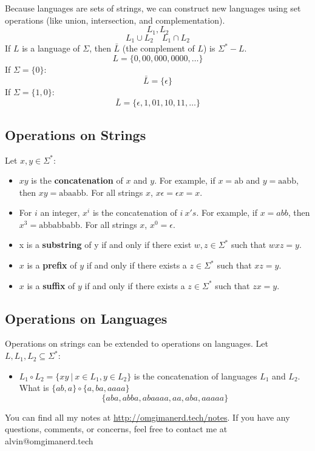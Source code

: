 \documentclass[letterpaper, 12pt]{math}
\begin{document}
Because languages are sets of strings, we can construct new languages using
set operations (like union, intersection, and complementation).
\[ L_{1}, L_{2} \]
\[ L_{1}\cup L_{2} \quad L_{1}\cap L_{2} \]
If \( L \) is a language of \( \Sigma \), then \( \bar{L} \) (the complement of
\( L \)) is \( \Sigma^*-L \).
\[ L = \{0,00,000,0000,\dots\} \]
If \( \Sigma = \{0\} \):
\[ \bar{L} = \{\epsilon\} \]
If \( \Sigma = \{1,0\} \):
\[ \bar{L} = \{\epsilon,1,01,10,11,\dots\} \]

\subsection*{Operations on Strings}
Let \( x,y\in\Sigma^* \):
\begin{itemize}
  \item \( xy \) is the \textbf{concatenation} of \( x \) and \( y \). For
    example, if \( x = \text{ab} \) and \( y = \text{aabb} \), then \( xy =
    \text{abaabb} \). For all strings \( x \), \( x\epsilon = \epsilon x =
    x \).
  \item For \( i \) an integer, \( x^i \) is the concatenation of \( i\ x's \).
    For example, if \( x = abb \), then \( x^{3} = \text{abbabbabb} \). For all
    strings \( x \), \( x^0 = \epsilon \).
  \item x is a \textbf{substring} of y if and only if there exist \( w,z\in
    \Sigma^* \) such that \( wxz = y \).
  \item \( x \) is a \textbf{prefix} of \( y \) if and only if there exists a
    \( z\in\Sigma^* \) such that \( xz = y \).
  \item \( x \) is a \textbf{suffix} of \( y \) if and only if there exists a
    \( z\in\Sigma^* \) such that \( zx = y \).
\end{itemize}

\subsection*{Operations on Languages}
Operations on strings can be extended to operations on languages. Let
\( L,L_1,L_2\subseteq\Sigma^* \):
\begin{itemize}
  \item \( L_1\circ L_2 = \{xy\ |\ x\in L_1,y\in L_2\} \) is the concatenation
    of languages \( L_1 \) and \( L_2 \). What is \( \{ab,a\}\circ\{a,ba,aaaa\}
    \)
    \[ \{aba,abba,abaaaa,aa,aba,aaaaa\} \]
\end{itemize}

\begin{center}
  You can find all my notes at \url{http://omgimanerd.tech/notes}. If you have
  any questions, comments, or concerns, feel free to contact me at
  alvin@omgimanerd.tech
\end{center}
\end{document}
